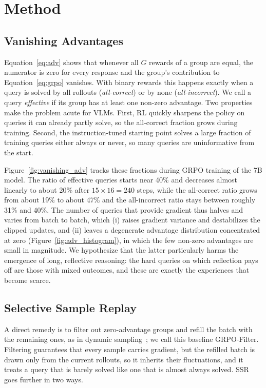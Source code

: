 \documentclass{article}
\begin{document}
\section{Method}
\label{sec:method}

\subsection{Vanishing Advantages}
\label{sec:vanishing}

Equation~\eqref{eq:adv} shows that whenever all $G$ rewards of a group are equal, the numerator is zero for every response and the group's contribution to Equation~\eqref{eq:grpo} vanishes. With binary rewards this happens exactly when a query is solved by all rollouts (\emph{all-correct}) or by none (\emph{all-incorrect}). We call a query \emph{effective} if its group has at least one non-zero advantage. Two properties make the problem acute for VLMs. First, RL quickly sharpens the policy on queries it can already partly solve, so the all-correct fraction grows during training. Second, the instruction-tuned starting point solves a large fraction of training queries either always or never, so many queries are uninformative from the start.


Figure~\ref{fig:vanishing_adv} tracks these fractions during GRPO training of the 7B model. The ratio of effective queries starts near 40\% and decreases almost linearly to about 20\% after $15\times16=240$ steps, while the all-correct ratio grows from about 19\% to about 47\% and the all-incorrect ratio stays between roughly 31\% and 40\%. The number of queries that provide gradient thus halves and varies from batch to batch, which (i) raises gradient variance and destabilizes the clipped updates, and (ii) leaves a degenerate advantage distribution concentrated at zero (Figure~\ref{fig:adv_histogram}), in which the few non-zero advantages are small in magnitude. We hypothesize that the latter particularly harms the emergence of long, reflective reasoning: the hard queries on which reflection pays off are those with mixed outcomes, and these are exactly the experiences that become scarce.


\subsection{Selective Sample Replay}
\label{sec:ssr}

A direct remedy is to filter out zero-advantage groups and refill the batch with the remaining ones, as in dynamic sampling~\cite{dapo}; we call this baseline GRPO-Filter. Filtering guarantees that every sample carries gradient, but the refilled batch is drawn only from the current rollouts, so it inherits their fluctuations, and it treats a query that is barely solved like one that is almost always solved. SSR goes further in two ways.
\end{document}
